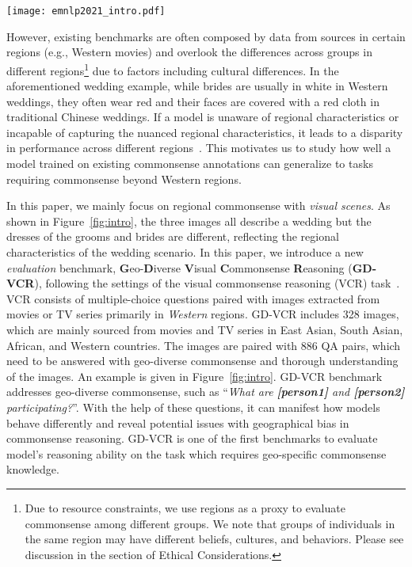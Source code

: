 \documentclass[11pt]{article}
\begin{document}
\begin{figure*}[t]
    \centering
    \texttt{[image: emnlp2021\_intro.pdf]}
    \caption{Examples in GD-VCR. The three images are all about weddings but from different regions (left-to-right order: Western, East Asian, South Asian). Current Vision-and-Language models perform well on answering questions about Western weddings but often make mistakes when encountering wedding scenarios in other regions.}
    \label{fig:intro}
\end{figure*}

However, existing benchmarks are often composed by data from sources in certain regions (e.g., Western movies) and overlook the differences across groups in different regions\footnote{Due to resource constraints, we use regions as a proxy to evaluate commonsense among different groups. We note that groups of individuals in the same region may have different beliefs, cultures, and behaviors. Please see discussion in the section of Ethical Considerations.} due to factors including cultural differences.
In the aforementioned wedding example, while brides are usually in white in Western weddings, they often wear red and their faces are covered with a red cloth in traditional Chinese weddings. 
If a model is unaware of regional characteristics or incapable of capturing the nuanced regional characteristics, it leads to a disparity in performance across different regions~\cite{Acharya2020AnAO}. 
This motivates us to study how well a model trained on existing commonsense annotations can generalize to tasks requiring commonsense beyond Western regions.

In this paper, we mainly focus on regional commonsense with \emph{visual scenes}.
As shown in Figure~\ref{fig:intro}, the three images all describe a wedding but the dresses of the grooms and brides are different, reflecting the regional characteristics of the wedding scenario. 
In this paper, we introduce a new \emph{evaluation} benchmark, \textbf{G}eo-\textbf{D}iverse \textbf{V}isual \textbf{C}ommonsense \textbf{R}easoning (\textbf{GD-VCR}), following the settings of the visual commonsense reasoning (VCR) task~\cite{zellers2019vcr}.
VCR consists of multiple-choice questions paired with images extracted from movies or TV series primarily in \emph{Western} regions. 
GD-VCR includes 328 images, which are mainly sourced from movies and TV series in East Asian, South Asian, African, and Western countries. The images are paired with 886 QA pairs, which need to be answered with geo-diverse commonsense and thorough understanding of the images.
An example is given in Figure~\ref{fig:intro}. GD-VCR benchmark addresses geo-diverse commonsense, such as ``\textit{What are \colorbox[rgb]{ .891,  .891,  .891}{\textbf{[person1]}} and \colorbox[rgb]{ .891,  .891,  .891}{\textbf{[person2]}} participating?}''. With the help of these questions, it can manifest how models behave differently and reveal potential issues with geographical bias in commonsense reasoning. 
GD-VCR is one of the first benchmarks to evaluate model's reasoning ability on the task which requires geo-specific commonsense knowledge.
\end{document}
